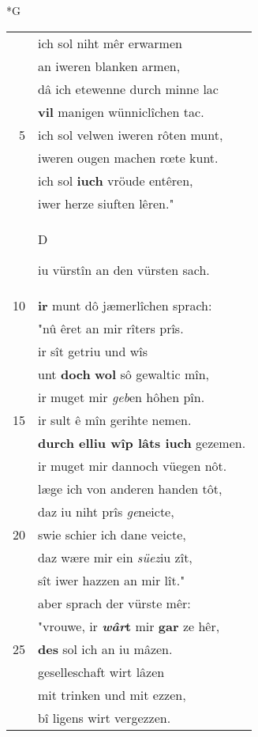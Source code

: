 \documentclass[8pt,a4paper,notitlepage]{article}
\begin{document}
\begin{table}[ht]
\begin{minipage}[t]{0.5\linewidth}
\small
\begin{center}*G
\end{center}
\begin{tabular}{rl}
 & ich sol niht mêr erwarmen\\ 
 & an iweren blanken armen,\\ 
 & dâ ich etewenne durch minne lac\\ 
 & \textbf{vil} manigen wünniclîchen tac.\\ 
5 & ich sol velwen iweren rôten munt,\\ 
 & iweren ougen machen rœte kunt.\\ 
 & ich sol \textbf{iuch} vröude entêren,\\ 
 & iwer herze siuften lêren."\\ 
 & \begin{large}D\end{large}iu vürstîn an den vürsten sach.\\ 
10 & \textbf{ir} munt dô jæmerlîchen sprach:\\ 
 & "nû êret an mir rîters prîs.\\ 
 & ir sît getriu und wîs\\ 
 & unt \textbf{doch} \textbf{wol} sô gewaltic mîn,\\ 
 & ir muget mir \textit{geb}en hôhen pîn.\\ 
15 & ir sult ê mîn gerihte nemen.\\ 
 & \textbf{durch elliu wîp lâts iuch} gezemen.\\ 
 & ir muget mir dannoch vüegen nôt.\\ 
 & læge ich von anderen handen tôt,\\ 
 & daz iu niht prîs \textit{ge}neicte,\\ 
20 & swie schier ich dane veicte,\\ 
 & daz wære mir ein \textit{süez}iu zît,\\ 
 & sît iwer hazzen an mir lît."\\ 
 & aber sprach der vürste mêr:\\ 
 & "vrouwe, ir \textbf{\textit{wâr}t} mir \textbf{gar} ze hêr,\\ 
25 & \textbf{des} sol ich an iu mâzen.\\ 
 & geselleschaft wirt lâzen\\ 
 & mit trinken und mit ezzen,\\ 
 & bî ligens wirt vergezzen.\\ 

\end{tabular}
\end{minipage}
\end{table}
\end{document}
